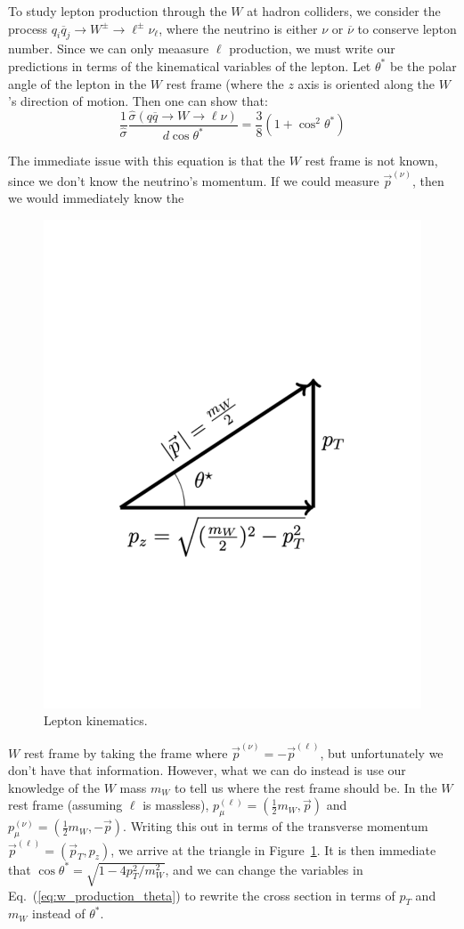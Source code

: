 \documentclass[11pt, oneside]{article}   	%
\theoremstyle{definition}
\numberwithin{equation}{subsection}		%
\begin{document}
To study lepton production through the $W$ at hadron colliders, we consider the process $q_i\overline q_j\rightarrow W^\pm\rightarrow 
\ell^\pm\nu_\ell$, where the neutrino is either $\nu$ or $\overline\nu$ to conserve lepton number. Since we can only meaasure $\ell$ 
production, we must write our predictions in terms of the kinematical variables of the lepton. Let $\theta^*$ be the polar angle of the lepton 
in the $W$ rest frame (where the $z$ axis is oriented along the $W$'s direction of motion. Then one can show that:
\begin{equation}
	\frac{1}{\hat\sigma}\frac{\hat\sigma(q\overline q\rightarrow W\rightarrow \ell\nu)}{d\cos\theta^*} = \frac{3}{8} (1 + \cos^2\theta^*)
	\label{eq:w_production_theta}
\end{equation}

The immediate issue with this equation is that the $W$ rest frame is not known, since we don't know the neutrino's momentum. If we could 
measure $\vec p^{(\nu)}$, then we would immediately know the 
\begingroup
\begin{figure}
	\vspace*{-.5cm}
	\centering
	\includegraphics[width = .25\textwidth]{w_production_triangle}
	\caption{Lepton kinematics.}
	\label{fig:w_triangle}
\end{figure}
$W$ rest frame by taking the frame where $\vec p^{(\nu)} = -\vec p^{(\ell)}$, but unfortunately we don't have that information. 
However, what we can do instead is use our knowledge of the $W$ mass $m_W$ to tell us where the rest frame should be. 
In the $W$ rest frame (assuming $\ell$ is massless), $p^{(\ell)}_\mu = (\frac{1}{2} m_W, \vec p)$ and $p^{(\nu)}_\mu = (\frac{1}{2} m_W, 
-\vec p)$. Writing this out in terms of the transverse momentum $\vec p^{(\ell)} = (\vec p_T, p_z)$, we arrive at the triangle in 
Figure~\ref{fig:w_triangle}. It is then immediate that $\cos\theta^* = \sqrt{1 - 4 p_T^2 / m_W^2}$, and we can change the variables in 
Eq.~(\ref{eq:w_production_theta}) to rewrite the cross section in terms of $p_T$ and $m_W$ instead of $\theta^*$. 
\end{document}
